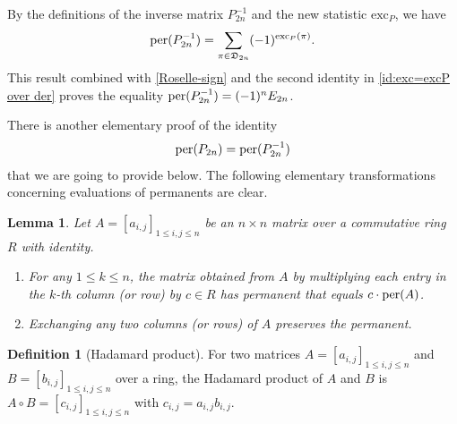 \documentclass[11pt,reqno]{amsart}
\numberwithin{equation}{section}
\theoremstyle{plain}
\newtheorem{lemma}[theorem]{Lemma}
\theoremstyle{definition}
\newtheorem{Def}[theorem]{Definition}
\def\exc{\mathrm{exc}}
\def\per{\mathrm{per}}
\newcommand{\D}{\mathfrak{D}}
\def\per{{\rm per}}
\begin{document}
By the definitions of the inverse matrix $P^{-1}_{2n}$ and the new statistic $\exc_P$, we have
$$\per(P^{-1}_{2n})=\sum_{\pi\in\D_{2n}}(-1)^{\exc_P(\pi)}.$$
This result combined with \eqref{Roselle-sign} and the second identity in \eqref{id:exc=excP over der} proves the equality $\per(P^{-1}_{2n})=(-1)^nE_{2n}$.

There is another elementary proof of the identity
\begin{equation}\label{Hadamard}
\per(P_{2n})=\per(P^{-1}_{2n})
\end{equation}
that we are going to provide below. The following elementary transformations concerning evaluations  of permanents are clear.

\begin{lemma}\label{ele:per}
Let $A=[a_{i,j}]_{1\leq i,j\leq n}$ be an $n\times n$ matrix over a commutative ring $R$ with identity.
\begin{enumerate}[{\rm (1)}]
\item For any $1\leq k\leq n$,  the matrix obtained from $A$ by multiplying each entry in the $k$-th column (or row) by $c\in R$ has permanent that equals $c\cdot\per(A)$.
\item Exchanging any two columns (or rows) of $A$ preserves the permanent.
\end{enumerate}
\end{lemma}

\begin{Def}[Hadamard product]  For two matrices $A=[a_{i,j}]_{1\leq i,j\leq n}$ and $B=[b_{i,j}]_{1\leq i,j\leq n}$ over a ring, the Hadamard product of $A$ and $B$ is $A\circ B=[c_{i,j}]_{1\leq i,j\leq n}$ with $c_{i,j}=a_{i,j}b_{i,j}$.
\end{Def}
\end{document}
